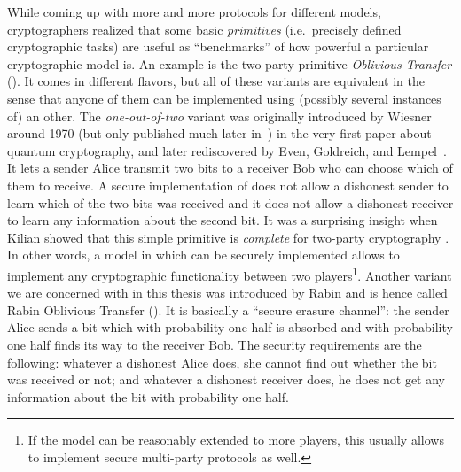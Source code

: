 While coming up with more and more protocols for different models,
cryptographers realized that some basic \emph{primitives}
(i.e.~precisely defined cryptographic tasks) are useful as
``benchmarks'' of how powerful a particular cryptographic model is.
An example is the two-party primitive \emph{
Oblivious Transfer} (\pOT).  It comes in different flavors,
but all of these variants are equivalent in the sense that anyone of
them can be implemented using (possibly several instances of) an
other.  The \emph{one-out-of-two} variant \OT was originally
introduced by Wiesner around 1970 (but only published much later
in~\cite{Wiesner83}) in the very first paper about quantum
cryptography, and later rediscovered by Even, Goldreich, and Lempel~\cite{EGL82}. It lets a sender Alice transmit two bits to a
receiver Bob who can choose which of them to receive. A secure
implementation of \OT does not allow a dishonest sender to learn which
of the two bits was received and it does not allow a dishonest
receiver to learn any information about the second bit. It was a
surprising insight when Kilian showed that this simple primitive is \emph{complete} for
two-party cryptography \cite{Kilian88}. In other words, a model in
which \OT can be securely implemented allows to implement any
cryptographic functionality between two players\footnote{If the model
  can be reasonably extended to more players, this usually allows to
  implement secure multi-party protocols as well.}. Another variant we
are concerned with in this thesis was introduced by Rabin
\cite{Rabin81} and is hence called Rabin Oblivious Transfer
(\RabinOT). It is basically a ``secure erasure channel'': the sender
Alice sends a bit which with probability one half is absorbed and with
probability one half finds its way to the receiver Bob. The security
requirements are the following: whatever a dishonest Alice does, she cannot find
out whether the bit was received or not; and whatever a dishonest
receiver does, he does not get any information about the bit with
probability one half.

